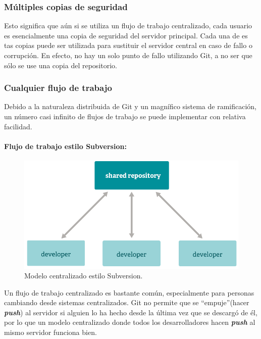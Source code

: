\documentclass[12pt, spanish, oneside, onecolumn, a4paper]{report}
\begin{document}
\subsubsection{Múltiples copias de seguridad} 
\label{sec:multiplebackups} Esto significa que aún si se utiliza un flujo de trabajo centralizado, cada usuario es esencialmente una copia de seguridad del servidor principal. Cada una de es tas copias puede ser utilizada para sustituir el servidor central en caso de fallo o corrupción. En efecto, no hay un solo punto de fallo utilizando Git, a no ser que sólo se use una copia del repositorio. 
\clearpage 
\subsubsection{Cualquier flujo de trabajo} 
\label{sec:anyworkflow} Debido a la naturaleza distribuida de Git y un magnífico sistema de ramificación, un número casi infinito de flujos de trabajo se puede implementar con relativa facilidad. 
\paragraph{Flujo de trabajo estilo Subversion:} 
\begin{figure} 
  \begin{center} 
    \includegraphics[width=.6\textwidth,keepaspectratio=true]{workflow-a.png} 
  \end{center} 
  \caption{Modelo centralizado estilo Subversion.} 
\end{figure} Un flujo de trabajo centralizado es bastante común, especialmente para personas cambiando desde sistemas centralizados. Git no permite que se ``empuje''(hacer \textbf{\emph{push}}) al servidor si alguien lo ha hecho desde la última vez que se descargó de él, por lo que un modelo centralizado donde todos los desarrolladores hacen \textbf{\emph{push}} al mismo servidor funciona bien. 
\end{document}
